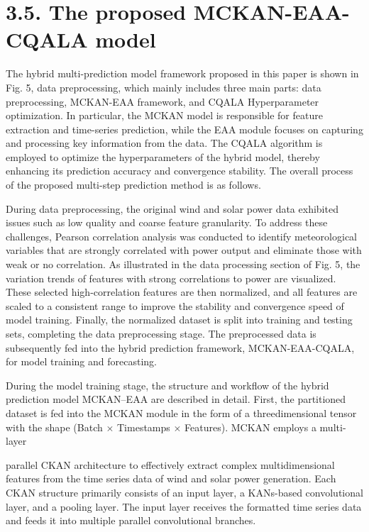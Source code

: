 \documentclass[
  10
]{article}
\begin{document}
\section{3.5. The proposed MCKAN-EAA-CQALA
model}\label{the-proposed-mckan-eaa-cqala-model}

The hybrid multi-prediction model framework proposed in this paper is
shown in Fig. 5, data preprocessing, which mainly includes three main
parts: data preprocessing, MCKAN-EAA framework, and CQALA Hyperparameter
optimization. In particular, the MCKAN model is responsible for feature
extraction and time-series prediction, while the EAA module focuses on
capturing and processing key information from the data. The CQALA
algorithm is employed to optimize the hyperparameters of the hybrid
model, thereby enhancing its prediction accuracy and convergence
stability. The overall process of the proposed multi-step prediction
method is as follows.

During data preprocessing, the original wind and solar power data
exhibited issues such as low quality and coarse feature granularity. To
address these challenges, Pearson correlation analysis was conducted to
identify meteorological variables that are strongly correlated with
power output and eliminate those with weak or no correlation. As
illustrated in the data processing section of Fig. 5, the variation
trends of features with strong correlations to power are visualized.
These selected high-correlation features are then normalized, and all
features are scaled to a consistent range to improve the stability and
convergence speed of model training. Finally, the normalized dataset is
split into training and testing sets, completing the data preprocessing
stage. The preprocessed data is subsequently fed into the hybrid
prediction framework, MCKAN-EAA-CQALA, for model training and
forecasting.

During the model training stage, the structure and workflow of the
hybrid prediction model MCKAN--EAA are described in detail. First, the
partitioned dataset is fed into the MCKAN module in the form of a
threedimensional tensor with the shape (Batch \(\times\) Timestamps
\(\times\) Features). MCKAN employs a multi-layer

parallel CKAN architecture to effectively extract complex
multidimensional features from the time series data of wind and solar
power generation. Each CKAN structure primarily consists of an input
layer, a KANs-based convolutional layer, and a pooling layer. The input
layer receives the formatted time series data and feeds it into multiple
parallel convolutional branches.
\end{document}
